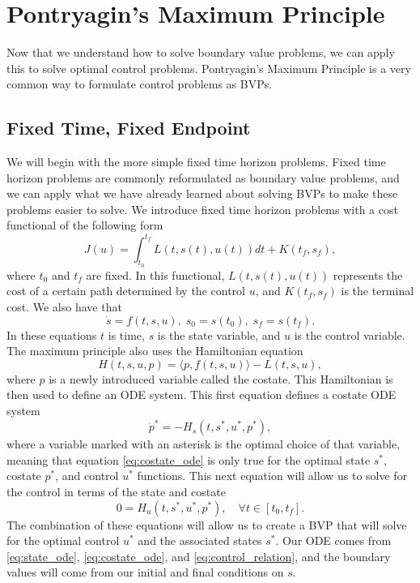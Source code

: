 \label{lab:ObstacleAvoidance}


\section*{Pontryagin's Maximum Principle}
Now that we understand how to solve boundary value problems, we can apply this to solve optimal control problems.
Pontryagin's Maximum Principle is a very common way to formulate control problems as BVPs.

\subsection*{Fixed Time, Fixed Endpoint}
We will begin with the more simple fixed time horizon problems.
Fixed time horizon problems are commonly reformulated as boundary value problems, and we can apply what we have already learned about solving BVPs to make these problems easier to solve.
We introduce fixed time horizon problems with a cost functional of the following form
\begin{equation}
    J(u) = \int_{t_0}^{t_f}L(t,s(t),u(t))dt + K(t_f,s_f),
\end{equation}
where $t_0$ and $t_f$ are fixed.
In this functional, $L(t,s(t),u(t))$ represents the cost of a certain path determined by the control $u$, and $K(t_f,s_f)$ is the terminal cost.
We also have that
\begin{equation}\label{eq:state_ode}
    \dot{s} = f(t,s,u),\; s_0 = s(t_0),\; s_f = s(t_f).
\end{equation}
In these equations $t$ is time, $s$ is the state variable, and $u$ is the control variable.
The maximum principle also uses the Hamiltonian equation
\begin{equation}
    H(t,s,u,p) = \langle p,f(t,s,u)\rangle - L(t,s,u),
\end{equation}
where $p$ is a newly introduced variable called the costate.
This Hamiltonian is then used to define an ODE system.
This first equation defines a costate ODE system
\begin{equation}\label{eq:costate_ode}
    \dot{p}^* = -H_s(t,s^*,u^*,p^*),
\end{equation}
where a variable marked with an asterisk is the optimal choice of that variable, meaning that equation \ref{eq:costate_ode} is only true for the optimal state $s^*$, costate $p^*$, and control $u^*$ functions.
This next equation will allow us to solve for the control in terms of the state and costate
\begin{equation}\label{eq:control_relation}
    0 = H_u(t,s^*,u^*,p^*), \quad \forall t\in[t_0,t_f].
\end{equation}
The combination of these equations will allow us to create a BVP that will solve for the optimal control $u^*$ and the associated states $s^*$.
Our ODE comes from \ref{eq:state_ode}, \ref{eq:costate_ode}, and \ref{eq:control_relation}, and the boundary values will come from our initial and final conditions on $s$.

